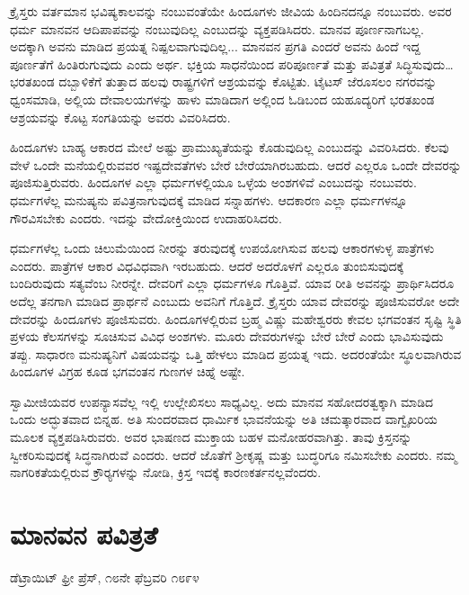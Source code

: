  ಕ್ರೈಸ್ತರು ವರ್ತಮಾನ ಭವಿಷ್ಯಕಾಲವನ್ನು ನಂಬುವಂತೆಯೇ ಹಿಂದೂಗಳು ಜೀವಿಯ ಹಿಂದಿನದನ್ನೂ ನಂಬುವರು. ಅವರ ಧರ್ಮ ಮಾನವನ ಆದಿಪಾಪವನ್ನು ನಂಬುವುದಿಲ್ಲ ಎಂಬುದನ್ನು ವ್ಯಕ್ತಪಡಿಸಿದರು. ಮಾನವ ಪೂರ್ಣನಾಗಬಲ್ಲ. ಅದಕ್ಕಾಗಿ ಅವನು ಮಾಡಿದ ಪ್ರಯತ್ನ ನಿಷ್ಪಲವಾಗುವುದಿಲ್ಲ... ಮಾನವನ ಪ್ರಗತಿ ಎಂದರೆ ಅವನು ಹಿಂದೆ ಇದ್ದ ಪೂರ್ಣತೆಗೆ ಹಿಂತಿರುಗುವುದು ಎಂದು ಅರ್ಥ. ಭಕ್ತಿಯ ಸಾಧನೆಯಿಂದ ಪರಿಪೂರ್ಣತೆ ಮತ್ತು ಪವಿತ್ರತೆ ಸಿದ್ಧಿಸುವುದು… ಭರತಖಂಡ ದಬ್ಬಾಳಿಕೆಗೆ ತುತ್ತಾದ ಹಲವು ರಾಷ್ಟ್ರಗಳಿಗೆ ಆಶ್ರಯವನ್ನು ಕೊಟ್ಟಿತು. ಟೈಟಸ್ ಜೆರೂಸಲಂ ನಗರವನ್ನು ಧ್ವಂಸಮಾಡಿ, ಅಲ್ಲಿಯ ದೇವಾಲಯಗಳನ್ನು ಹಾಳು ಮಾಡಿದಾಗ ಅಲ್ಲಿಂದ ಓಡಿಬಂದ ಯಹೂದ್ಯರಿಗೆ ಭರತಖಂಡ ಆಶ್ರಯವನ್ನು ಕೊಟ್ಟ ಸಂಗತಿಯನ್ನು ಅವರು ವಿವರಿಸಿದರು. 

 ಹಿಂದೂಗಳು ಬಾಹ್ಯ ಆಕಾರದ ಮೇಲೆ ಅಷ್ಟು ಪ್ರಾಮುಖ್ಯತೆಯನ್ನು ಕೊಡುವುದಿಲ್ಲ ಎಂಬುದನ್ನು ವಿವರಿಸಿದರು. ಕೆಲವು ವೇಳೆ ಒಂದೇ ಮನೆಯಲ್ಲಿರುವವರ ಇಷ್ಟದೇವತೆಗಳು ಬೇರೆ ಬೇರೆಯಾಗಿರಬಹುದು. ಆದರೆ ಎಲ್ಲರೂ ಒಂದೇ ದೇವರನ್ನು ಪೂಜಿಸುತ್ತಿರುವರು. ಹಿಂದೂಗಳ ಎಲ್ಲಾ ಧರ್ಮಗಳಲ್ಲಿಯೂ ಒಳ್ಳೆಯ ಅಂಶಗಳಿವೆ ಎಂಬುದನ್ನು ನಂಬುವರು. ಧರ್ಮಗಳೆಲ್ಲ ಮನುಷ್ಯನು ಪವಿತ್ರನಾಗುವುದಕ್ಕೆ ಮಾಡಿದ ಸನ್ನಾಹಗಳು. ಆದಕಾರಣ ಎಲ್ಲಾ ಧರ್ಮಗಳನ್ನೂ ಗೌರವಿಸಬೇಕು ಎಂದರು. ಇದನ್ನು ವೇದೋಕ್ತಿಯಿಂದ ಉದಾಹರಿಸಿದರು. 

 ಧರ್ಮಗಳೆಲ್ಲ ಒಂದು ಚಿಲುಮೆಯಿಂದ ನೀರನ್ನು ತರುವುದಕ್ಕೆ ಉಪಯೋಗಿಸುವ ಹಲವು ಆಕಾರಗಳುಳ್ಳ ಪಾತ್ರೆಗಳು ಎಂದರು. ಪಾತ್ರೆಗಳ ಆಕಾರ ವಿಧವಿಧವಾಗಿ ಇರಬಹುದು. ಆದರೆ ಅದರೊಳಗೆ ಎಲ್ಲರೂ ತುಂಬಿಸುವುದಕ್ಕೆ ಬಂದಿರುವುದು ಸತ್ಯವೆಂಬ ನೀರನ್ನೇ. ದೇವರಿಗೆ ಎಲ್ಲಾ ಧರ್ಮಗಳೂ ಗೊತ್ತಿವೆ. ಯಾವ ರೀತಿ ಅವನನ್ನು ಪ್ರಾರ್ಥಿಸಿದರೂ ಅದೆಲ್ಲ ತನಗಾಗಿ ಮಾಡಿದ ಪ್ರಾರ್ಥನೆ ಎಂಬುದು ಅವನಿಗೆ ಗೊತ್ತಿದೆ. ಕ್ರೈಸ್ತರು ಯಾವ ದೇವರನ್ನು ಪೂಜಿಸುವರೋ ಅದೇ ದೇವರನ್ನು ಹಿಂದೂಗಳು ಪೂಜಿಸುವರು. ಹಿಂದೂಗಳಲ್ಲಿರುವ ಬ್ರಹ್ಮ ವಿಷ್ಣು ಮಹೇಶ್ವರರು ಕೇವಲ ಭಗವಂತನ ಸೃಷ್ಟಿ ಸ್ಥಿತಿ ಪ್ರಳಯ ಕೆಲಸಗಳನ್ನು ಸೂಚಿಸುವ ವಿವಿಧ ಅಂಶಗಳು. ಮೂರು ದೇವರುಗಳನ್ನು ಬೇರೆ ಬೇರೆ ಎಂದು ಭಾವಿಸುವುದು ತಪ್ಪು. ಸಾಧಾರಣ ಮನುಷ್ಯನಿಗೆ ವಿಷಯವನ್ನು ಒತ್ತಿ ಹೇಳಲು ಮಾಡಿದ ಪ್ರಯತ್ನ ಇದು. ಅದರಂತೆಯೇ ಸ್ಥೂಲವಾಗಿರುವ ಹಿಂದೂಗಳ ವಿಗ್ರಹ ಕೂಡ ಭಗವಂತನ ಗುಣಗಳ ಚಿಹ್ನೆ ಅಷ್ಟೇ. 

 ಸ್ವಾಮೀಜಿಯವರ ಉಪನ್ಯಾಸವೆಲ್ಲ ಇಲ್ಲಿ ಉಲ್ಲೇಖಿಸಲು ಸಾಧ್ಯವಿಲ್ಲ. ಅದು ಮಾನವ ಸಹೋದರತ್ವಕ್ಕಾಗಿ ಮಾಡಿದ ಒಂದು ಅದ್ಭುತವಾದ ಬಿನ್ನಹ. ಅತಿ ಸುಂದರವಾದ ಧಾರ್ಮಿಕ ಭಾವನೆಯನ್ನು ಅತಿ ಚಮತ್ಕಾರವಾದ ವಾಗ್ವೈಖರಿಯ ಮೂಲಕ ವ್ಯಕ್ತಪಡಿಸಿರುವರು. ಅವರ ಭಾಷಣದ ಮುಕ್ತಾಯ ಬಹಳ ಮನೋಹರವಾಗಿತ್ತು. ತಾವು ಕ್ರಿಸ್ತನನ್ನು ಸ್ವೀಕರಿಸುವುದಕ್ಕೆ ಸಿದ್ಧನಾಗಿರುವೆ ಎಂದರು. ಆದರೆ ಜೊತೆಗೆ ಶ‍್ರೀಕೃಷ್ಣ ಮತ್ತು ಬುದ್ಧರಿಗೂ ನಮಿಸಬೇಕು ಎಂದರು. ನಮ್ಮ ನಾಗರಿಕತೆಯಲ್ಲಿರುವ ಕ್ರೌರ‍್ಯಗಳನ್ನು ನೋಡಿ, ಕ್ರಿಸ್ತ ಇದಕ್ಕೆ ಕಾರಣಕರ್ತನಲ್ಲವೆಂದರು.


\section{ಮಾನವನ ಪವಿತ್ರತೆ }

\begin{flushright}
ಡೆಟ್ರಾಯಿಟ್ ಫ್ರೀ ಪ್ರೆಸ್, ೧೮ನೇ ಫೆಬ್ರವರಿ ೧೮೯೪ 
\end{flushright}

